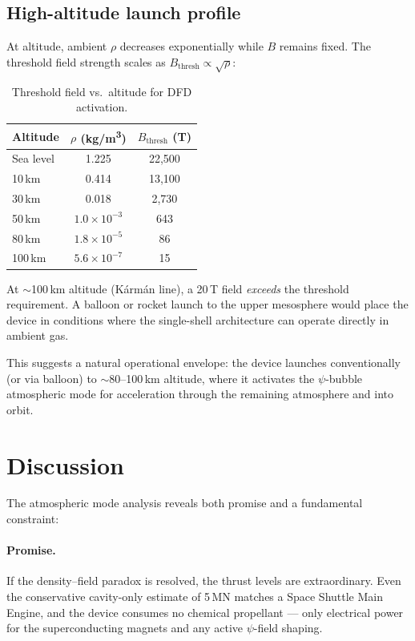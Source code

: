 \documentclass[12pt,twocolumn]{article}
\begin{document}
\subsection{High-altitude launch profile}

At altitude, ambient $\rho$ decreases exponentially while $B$ remains
fixed. The threshold field strength scales as
$B_\mathrm{thresh} \propto \sqrt{\rho}$:

\begin{table}[H]
\centering
\caption{Threshold field vs.\ altitude for DFD activation.}
\label{tab:altitude}
\begin{tabular}{@{}lcc@{}}
\toprule
Altitude & $\rho$ (\si{kg/m^3}) & $B_\mathrm{thresh}$ (\si{T}) \\
\midrule
Sea level   & 1.225          & 22{,}500 \\
10\,km      & 0.414          & 13{,}100 \\
30\,km      & 0.018          & 2{,}730 \\
50\,km      & $1.0\times10^{-3}$ & 643 \\
80\,km      & $1.8\times10^{-5}$ & 86 \\
100\,km     & $5.6\times10^{-7}$ & 15 \\
\bottomrule
\end{tabular}
\end{table}

At $\sim$100\,km altitude (K\'{a}rm\'{a}n line), a 20\,T field
\emph{exceeds} the threshold requirement. A balloon or rocket launch
to the upper mesosphere would place the device in conditions where
the single-shell architecture can operate directly in ambient gas.

This suggests a natural operational envelope: the device launches
conventionally (or via balloon) to $\sim$80--100\,km altitude, where
it activates the $\psi$-bubble atmospheric mode for acceleration
through the remaining atmosphere and into orbit.

\section{Discussion}
\label{sec:discussion}

The atmospheric mode analysis reveals both promise and a fundamental
constraint:

\paragraph{Promise.}
If the density--field paradox is resolved, the thrust levels are
extraordinary. Even the conservative cavity-only estimate of 5\,MN
matches a Space Shuttle Main Engine, and the device consumes no
chemical propellant --- only electrical power for the superconducting
magnets and any active $\psi$-field shaping.
\end{document}

